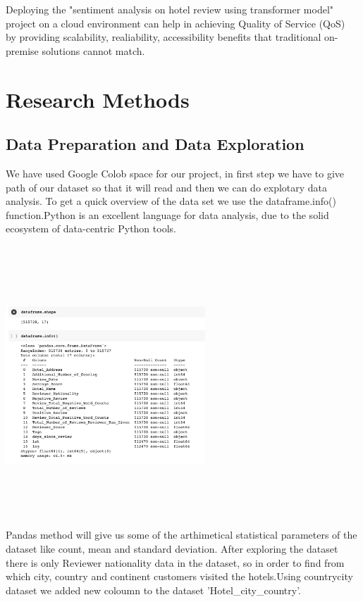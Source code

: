Deploying the "sentiment analysis on hotel review using transformer model" project on a cloud environment can help in achieving Quality of Service (QoS)~\cite{wang2018cloud}
by providing scalability, realiability,  accessibility benefits that traditional on-premise solutions cannot match.
\section{Research Methods }
\subsection{Data Preparation and Data Exploration}
We have used Google Colob space for our project, in first step we have to give path of our dataset so that it will read and then we can do explotary data analysis. To get a quick overview of the data set we use the dataframe.info() function.Python is an excellent language for data analysis, due
to the solid ecosystem of data-centric Python tools.

\includegraphics[width=7.5cm, height=10.5cm ]{dataframe.jpeg}\\
Pandas method will give us some of the arthimetical statistical parameters
of the dataset like count, mean and standard deviation.
After exploring the dataset there is only Reviewer nationality data in the dataset, so in order to find from which city, country and continent customers visited the hotels.Using countrycity dataset we added new coloumn to the dataset 'Hotel\_city\_country'.

